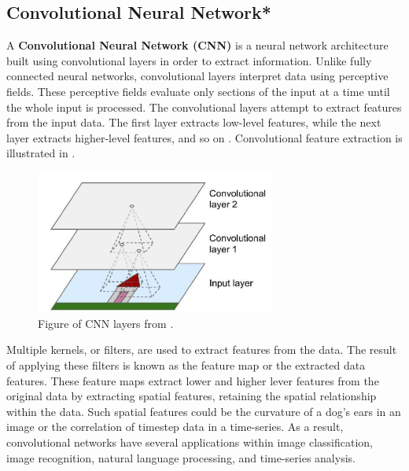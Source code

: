\subsection{Convolutional Neural Network*}
\label{section:BT:CNN}
A \textbf{Convolutional Neural Network (CNN)} is a neural network architecture built using convolutional layers in order to extract information.
Unlike fully connected neural networks, convolutional layers interpret data using perceptive fields.
These perceptive fields evaluate only sections of the input at a time until the whole input is processed.
The convolutional layers attempt to extract features from the input data.
The first layer extracts low-level features, while the next layer extracts higher-level features, and so on
\cite[p.~443-446]{Geron2017}. Convolutional feature extraction is illustrated in .


\begin{figure}[h!]
  \centering
  \includegraphics[width=0.7\textwidth]{./sections/BT/figures/convolution_hands_one_machine_learning.png}
  \hfill
  \caption{Figure of CNN layers from \cite[p.~444]{Geron2017}.}
  \label{fig:convolution}
\end{figure}


Multiple kernels, or filters, are used to extract features from the data.
The result of applying these filters is known as the feature map or the extracted data features.
These feature maps extract lower and higher lever features from the original data by
extracting spatial features, retaining the spatial relationship within the data.
Such spatial features could be the curvature of a dog's ears in an image or the correlation of timestep data in a time-series.
As a result, convolutional networks have several applications within image classification,
image recognition, natural language processing, and time-series analysis.



